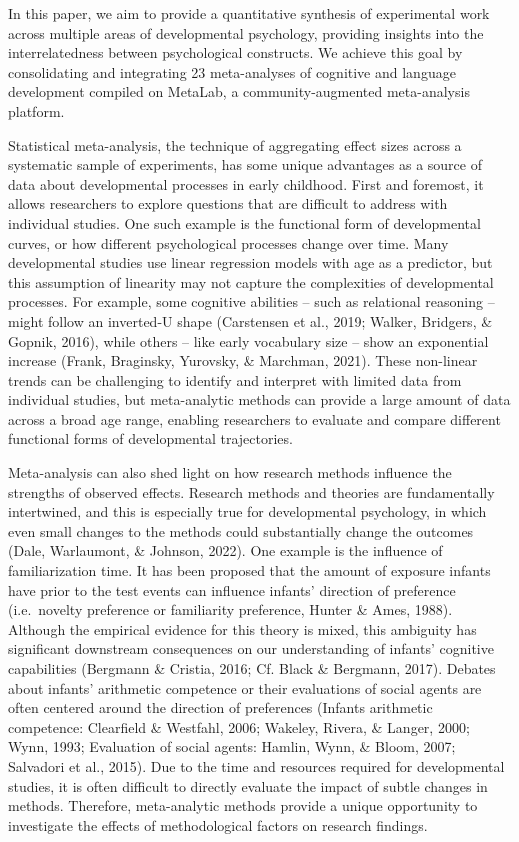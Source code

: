 \documentclass[10pt, letterpaper]{article}
\begin{document}
In this paper, we aim to provide a quantitative synthesis of
experimental work across multiple areas of developmental psychology,
providing insights into the interrelatedness between psychological
constructs. We achieve this goal by consolidating and integrating 23
meta-analyses of cognitive and language development compiled on MetaLab,
a community-augmented meta-analysis platform.

Statistical meta-analysis, the technique of aggregating effect sizes
across a systematic sample of experiments, has some unique advantages as
a source of data about developmental processes in early childhood. First
and foremost, it allows researchers to explore questions that are
difficult to address with individual studies. One such example is the
functional form of developmental curves, or how different psychological
processes change over time. Many developmental studies use linear
regression models with age as a predictor, but this assumption of
linearity may not capture the complexities of developmental processes.
For example, some cognitive abilities -- such as relational reasoning --
might follow an inverted-U shape (Carstensen et al., 2019; Walker,
Bridgers, \& Gopnik, 2016), while others -- like early vocabulary size
-- show an exponential increase (Frank, Braginsky, Yurovsky, \&
Marchman, 2021). These non-linear trends can be challenging to identify
and interpret with limited data from individual studies, but
meta-analytic methods can provide a large amount of data across a broad
age range, enabling researchers to evaluate and compare different
functional forms of developmental trajectories.

Meta-analysis can also shed light on how research methods influence the
strengths of observed effects. Research methods and theories are
fundamentally intertwined, and this is especially true for developmental
psychology, in which even small changes to the methods could
substantially change the outcomes (Dale, Warlaumont, \& Johnson, 2022).
One example is the influence of familiarization time. It has been
proposed that the amount of exposure infants have prior to the test
events can influence infants' direction of preference (i.e.~novelty
preference or familiarity preference, Hunter \& Ames, 1988). Although
the empirical evidence for this theory is mixed, this ambiguity has
significant downstream consequences on our understanding of infants'
cognitive capabilities (Bergmann \& Cristia, 2016; Cf. Black \&
Bergmann, 2017). Debates about infants' arithmetic competence or their
evaluations of social agents are often centered around the direction of
preferences (Infants arithmetic competence: Clearfield \& Westfahl,
2006; Wakeley, Rivera, \& Langer, 2000; Wynn, 1993; Evaluation of social
agents: Hamlin, Wynn, \& Bloom, 2007; Salvadori et al., 2015). Due to
the time and resources required for developmental studies, it is often
difficult to directly evaluate the impact of subtle changes in methods.
Therefore, meta-analytic methods provide a unique opportunity to
investigate the effects of methodological factors on research findings.
\end{document}
